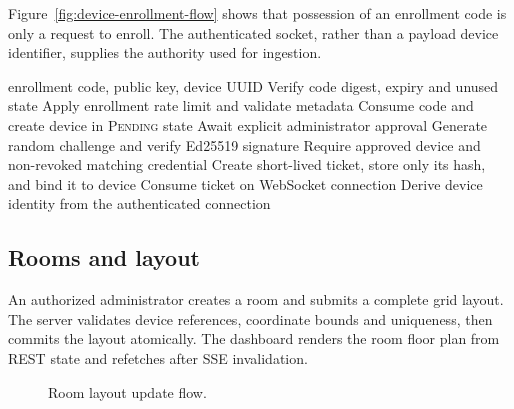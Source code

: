 \documentclass[12pt,a4paper]{report}
\begin{document}
Figure~\ref{fig:device-enrollment-flow} shows that possession of an enrollment
code is only a request to enroll. The authenticated socket, rather than a
payload device identifier, supplies the authority used for ingestion.

\begin{algorithm}[H]
\caption{Device enrollment and ticket issuance}
\label{alg:enrollment}
\begin{algorithmic}[1]
\Require enrollment code, public key, device UUID
\State Verify code digest, expiry and unused state
\State Apply enrollment rate limit and validate metadata
\State Consume code and create device in \textsc{Pending} state
\State Await explicit administrator approval
\State Generate random challenge and verify Ed25519 signature
\State Require approved device and non-revoked matching credential
\State Create short-lived ticket, store only its hash, and bind it to device
\State Consume ticket on WebSocket connection
\State Derive device identity from the authenticated connection
\end{algorithmic}
\end{algorithm}

\subsection{Rooms and layout}
An authorized administrator creates a room and submits a complete grid layout.
The server validates device references, coordinate bounds and uniqueness, then
commits the layout atomically. The dashboard renders the room floor plan from
REST state and refetches after SSE invalidation.

\begin{figure}[H]
\centering
{}
\caption{Room layout update flow.}
\label{fig:room-layout-flow}
\end{figure}
\end{document}

